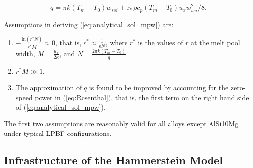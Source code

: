 \documentclass [11pt, proquest] {uwthesis}[2020/02/24]
\begin{document}
\noindent 
\begin{equation}
q=\pi k(T_{m}-T_{0})w_{ssi}+\text{e}\pi\rho c_{p}(T_{m}-T_{0})u_{x}w_{ssi}^{2}/8.\label{eq:analytical_sol_mpw}
\end{equation}

Assumptions in deriving (\ref{eq:analytical_sol_mpw}) are:
\begin{enumerate}
\item $-\frac{\text{ln}(r^{*}N)}{r^{*}M}\approx0$, that is, $r^{*}\approx\frac{1}{\text{e}N}$,
where $r^{*}$ is the values of $r$ at the melt pool width, $M=\frac{u_{x}}{2\kappa}$,
and $N=\frac{2\pi k(T_{m}-T_{0})}{q}$. 
\item $r^{*}M\gg1$.
\item The approximation of $q$ is found to be improved by accounting for
the zero-speed power in (\ref{eq:Rosenthal}), that is, the first
term on the right hand side of (\ref{eq:analytical_sol_mpw}). 
\end{enumerate}
The first two assumptions are reasonably valid for all alloys except
AlSi10Mg under typical LPBF configurations.

\subsection{Infrastructure of the Hammerstein Model}
\end{document}
